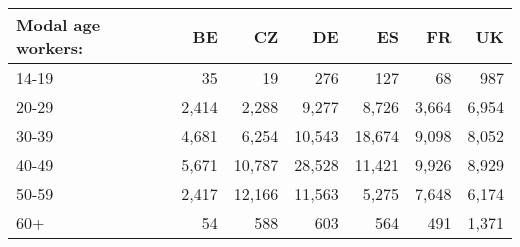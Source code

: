 \begin{tabular}{lrrrrrr}
\toprule
Modal age workers: & BE    & CZ     & DE     & ES     & FR    & UK    \\
\midrule
14-19              & 35    & 19     & 276    & 127    & 68    & 987   \\
20-29              & 2,414 & 2,288  & 9,277  & 8,726  & 3,664 & 6,954 \\
30-39              & 4,681 & 6,254  & 10,543 & 18,674 & 9,098 & 8,052 \\
40-49              & 5,671 & 10,787 & 28,528 & 11,421 & 9,926 & 8,929 \\
50-59              & 2,417 & 12,166 & 11,563 & 5,275  & 7,648 & 6,174 \\
60+                & 54    & 588    & 603    & 564    & 491   & 1,371 \\
\bottomrule
\end{tabular}

